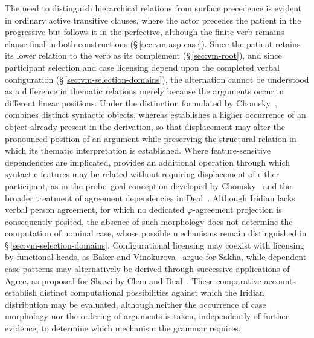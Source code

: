 The need to distinguish hierarchical relations from surface precedence is
evident in ordinary active transitive clauses, where the actor precedes the
patient in the progressive but follows it in the perfective, although the
finite verb remains clause-final in both constructions
(§\,\ref{sec:vm-asp-case}). Since the patient retains its lower relation to
the verb as its complement (§\,\ref{sec:vm-root}), and since participant
selection and case licensing depend upon the completed verbal configuration
(§\,\ref{sec:vm-selection-domains}), the alternation cannot be understood as
a difference in thematic relations merely because the arguments occur in
different linear positions. Under the distinction formulated by
Chomsky~\cite[p.~140]{chomsky2008},  combines distinct
syntactic objects, whereas  establishes a higher
occurrence of an object already present in the derivation, so that
displacement may alter the pronounced position of an argument while
preserving the structural relation in which its thematic interpretation is
established. Where feature-sensitive dependencies are implicated,
 provides an additional operation through which syntactic
features may be related without requiring displacement of either
participant, as in the probe--goal conception developed by
Chomsky~\cite[p.~101]{chomsky2000} and the broader treatment of agreement
dependencies in Deal~\cite{deal2025}. Although Iridian lacks verbal person
agreement, for which no dedicated $\varphi$-agreement projection is
consequently posited, the absence of such morphology does not determine the
computation of nominal case, whose possible mechanisms remain distinguished
in §\,\ref{sec:vm-selection-domains}. Configurational licensing may coexist
with licensing by functional heads, as Baker and
Vinokurova~\cite[§1]{bakervinokurova2010} argue for Sakha, while
dependent-case patterns may alternatively be derived through successive
applications of Agree, as proposed for Shawi by Clem and
Deal~\cite[§1]{clemdeal2026}. These comparative accounts establish distinct
computational possibilities against which the Iridian distribution may be
evaluated, although neither the occurrence of case morphology nor the
ordering of arguments is taken, independently of further evidence, to
determine which mechanism the grammar requires.

